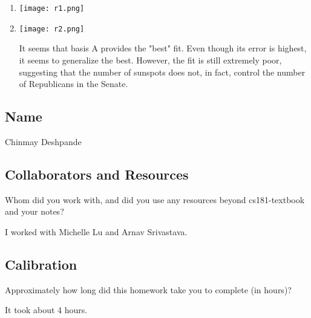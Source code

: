 \documentclass[submit]{harvardml}
\begin{document}
\begin{enumerate}
    \item \texttt{[image: r1.png]}
    
    \item \texttt{[image: r2.png]}
    
    It seems that basis A provides the "best" fit.  Even though its error is highest, it seems to generalize the best.  However, the fit is still extremely poor, suggesting that the number of sunspots does not, in fact, control the number of Republicans in the Senate.
\end{enumerate}



\newpage
\subsection*{Name} Chinmay Deshpande

\subsection*{Collaborators and Resources}
Whom did you work with, and did you use any resources beyond cs181-textbook and your notes?

I worked with Michelle Lu and Arnav Srivastava.

\subsection*{Calibration}
Approximately how long did this homework take you to complete (in hours)?

It took about 4 hours.
\end{document}
